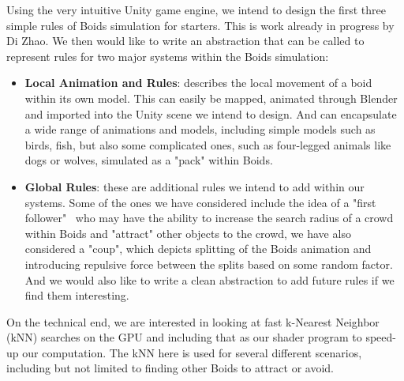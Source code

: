 Using the very intuitive Unity game engine, we intend to design the first three simple rules of Boids simulation for starters. This is work already in progress by Di Zhao. We then would like to write an abstraction that can be called to represent rules for two major systems within the Boids simulation:
\begin{itemize}
    \item \textbf{Local Animation and Rules}: describes the local movement of a boid within its own model. This can easily be mapped, animated through Blender and imported into the Unity scene we intend to design. And can encapsulate a wide range of animations and models, including simple models such as birds, fish, but also some complicated ones, such as four-legged animals like dogs or wolves, simulated as a "pack" within Boids.
    \item \textbf{Global Rules}: these are additional rules we intend to add within our systems. Some of the ones we have considered include the idea of a "first follower"~\cite{FirstFollower} who may have the ability to increase the search radius of a crowd within Boids and "attract" other objects to the crowd, we have also considered a "coup", which depicts splitting of the Boids animation and introducing repulsive force between the splits based on some random factor. And we would also like to write a clean abstraction to add future rules if we find them interesting.
\end{itemize}

On the technical end, we are interested in looking at fast k-Nearest Neighbor (kNN) searches on the GPU and including that as our shader program to speed-up our computation. The kNN here is used for several different scenarios, including but not limited to finding other Boids to attract or avoid.